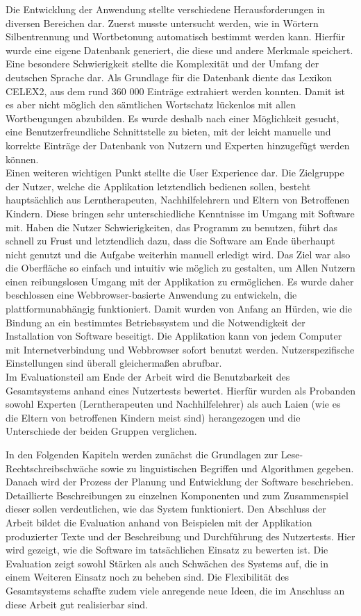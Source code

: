Die Entwicklung der Anwendung stellte verschiedene Herausforderungen in diversen Bereichen dar. Zuerst musste untersucht werden, wie in Wörtern Silbentrennung und Wortbetonung automatisch bestimmt werden kann. Hierfür wurde eine eigene Datenbank generiert, die diese und andere Merkmale speichert. Eine besondere Schwierigkeit stellte die Komplexität und der Umfang der deutschen Sprache dar. Als Grundlage für die Datenbank diente das Lexikon CELEX2, aus dem rund 360 000 Einträge extrahiert werden konnten. Damit ist es aber nicht möglich den sämtlichen Wortschatz lückenlos mit allen Wortbeugungen abzubilden. Es wurde deshalb nach einer Möglichkeit gesucht, eine Benutzerfreundliche Schnittstelle zu bieten, mit der leicht manuelle und korrekte Einträge der Datenbank von Nutzern und Experten hinzugefügt werden können.\\
Einen weiteren wichtigen Punkt stellte die User Experience dar. Die Zielgruppe der Nutzer, welche die Applikation letztendlich bedienen sollen, besteht hauptsächlich aus Lerntherapeuten, Nachhilfelehrern und Eltern von Betroffenen Kindern. Diese bringen sehr unterschiedliche Kenntnisse im Umgang mit Software mit. Haben die Nutzer Schwierigkeiten, das Programm zu benutzen, führt das schnell zu Frust und letztendlich dazu, dass die Software am Ende überhaupt nicht genutzt und die Aufgabe weiterhin manuell erledigt wird.  Das Ziel war also die Oberfläche so einfach und intuitiv wie möglich zu gestalten, um Allen Nutzern einen reibungslosen Umgang mit der Applikation zu ermöglichen. Es wurde daher beschlossen eine Webbrowser-basierte Anwendung zu entwickeln, die plattformunabhängig funktioniert. Damit wurden von Anfang an Hürden, wie die Bindung an ein bestimmtes Betriebssystem und die Notwendigkeit der Installation von Software beseitigt. Die Applikation kann von jedem Computer mit Internetverbindung und Webbrowser sofort benutzt werden. Nutzerspezifische Einstellungen sind überall gleichermaßen abrufbar.\\
Im Evaluationsteil am Ende der Arbeit wird die Benutzbarkeit des Gesamtsystems anhand eines Nutzertests bewertet. Hierfür wurden als Probanden sowohl Experten (Lerntherapeuten und Nachhilfelehrer)  als auch Laien (wie es die Eltern von betroffenen Kindern meist sind) herangezogen und die Unterschiede der beiden Gruppen verglichen.

In den Folgenden Kapiteln werden zunächst die Grundlagen zur Lese-Rechtschreibschwäche sowie zu linguistischen Begriffen und Algorithmen gegeben. Danach wird der Prozess der Planung und Entwicklung der Software beschrieben. Detaillierte Beschreibungen zu einzelnen Komponenten und zum Zusammenspiel dieser sollen verdeutlichen, wie das System funktioniert. Den Abschluss der Arbeit bildet die Evaluation anhand von Beispielen mit der Applikation produzierter Texte und der Beschreibung und Durchführung des Nutzertests. Hier wird gezeigt, wie die Software im tatsächlichen Einsatz zu bewerten ist. Die Evaluation zeigt sowohl Stärken als auch Schwächen des Systems auf, die in einem Weiteren Einsatz noch zu beheben sind. Die Flexibilität des Gesamtsystems schaffte zudem viele anregende neue Ideen, die im Anschluss an diese Arbeit gut realisierbar sind.